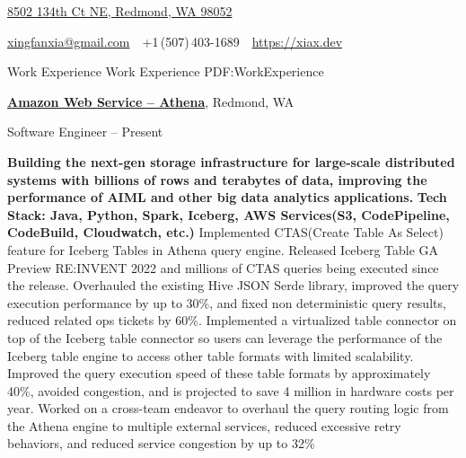 \documentclass[a4paper,MMMyyyy,nonstopmode]{simpleresumecv}
\newcommand{\CVAuthor}{Xingfan Xia}
\newcommand{\CVWebpage}{https://xiax.dev}
\begin{document}

\Title{\CVAuthor}

\begin{SubTitle}
\href{https://www.google.com/maps/place/8502+134th+Ct+NE,+Redmond,+WA+98052}
{8502 134th Ct NE, Redmond, WA 98052}
\par
\href{mailto:xingfanxia@gmail.com}
{xingfanxia@gmail.com}
\,\SubBulletSymbol\,
+1\,(507)\,403-1689
\,\SubBulletSymbol\,
\href{\CVWebpage}
{\url{\CVWebpage}}
\end{SubTitle}

\begin{Body}

\Section
{Work\newline
Experience}
{Work Experience}
{PDF:WorkExperience}

\Entry
\href{https://aws.amazon.com/athena/}
{\textbf{Amazon Web Service -- Athena}},
Redmond, WA

\Gap
\BulletItem
Software Engineer
\hfill
{} --
Present
\begin{Detail}
\SubBulletItem
\textbf{Building the next-gen storage infrastructure for large-scale distributed systems with billions of rows and terabytes of data, improving the performance of AIML and other big data analytics applications.}
\SubBulletItem \textbf{Tech Stack: Java, Python, Spark, Iceberg, AWS Services(S3, CodePipeline, CodeBuild, Cloudwatch, etc.)}
\SubBulletItem
Implemented CTAS(Create Table As Select) feature for Iceberg Tables in Athena query engine. Released Iceberg Table GA Preview RE:INVENT 2022 and millions of CTAS queries being executed since the release.
\SubBulletItem
Overhauled the existing Hive JSON Serde library, improved the query execution performance by up to 30\%, and fixed non deterministic query results, reduced related ops tickets by 60\%.
\SubBulletItem
Implemented a virtualized table connector on top of the Iceberg table connector so users can leverage the performance of the Iceberg table engine to access other table formats with limited scalability. 
Improved the query execution speed of these table formats by approximately 40\%, avoided congestion, and is projected to save 4 million in hardware costs per year.
\SubBulletItem
Worked on a cross-team endeavor to overhaul the query routing logic from the Athena engine to multiple external services, reduced excessive retry behaviors, and reduced service congestion by up to 32\%
\end{Detail}


\end{Body}
\end{document}
